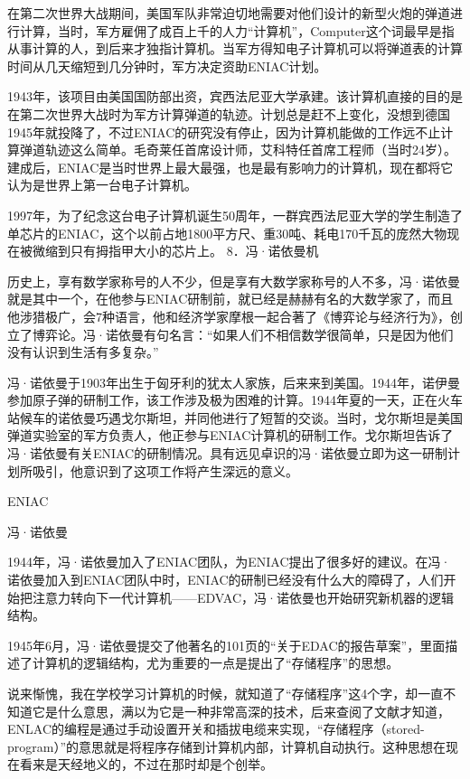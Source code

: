 \documentclass[12pt,UTF8]{ctexbook}
\begin{document}
在第二次世界大战期间，美国军队非常迫切地需要对他们设计的新型火炮的弹道进行计算，当时，军方雇佣了成百上千的人力“计算机”，Computer这个词最早是指从事计算的人，到后来才独指计算机。当军方得知电子计算机可以将弹道表的计算时间从几天缩短到几分钟时，军方决定资助ENIAC计划。

1943年，该项目由美国国防部出资，宾西法尼亚大学承建。该计算机直接的目的是在第二次世界大战时为军方计算弹道的轨迹。计划总是赶不上变化，没想到德国1945年就投降了，不过ENIAC的研究没有停止，因为计算机能做的工作远不止计算弹道轨迹这么简单。毛奇莱任首席设计师，艾科特任首席工程师（当时24岁）。建成后，ENIAC是当时世界上最大最强，也是最有影响力的计算机，现在都将它认为是世界上第一台电子计算机。

1997年，为了纪念这台电子计算机诞生50周年，一群宾西法尼亚大学的学生制造了单芯片的ENIAC，这个以前占地1800平方尺、重30吨、耗电170千瓦的庞然大物现在被微缩到只有拇指甲大小的芯片上。
8．冯·诺依曼机

历史上，享有数学家称号的人不少，但是享有大数学家称号的人不多，冯·诺依曼就是其中一个，在他参与ENIAC研制前，就已经是赫赫有名的大数学家了，而且他涉猎极广，会7种语言，他和经济学家摩根一起合著了《博弈论与经济行为》，创立了博弈论。冯·诺依曼有句名言：“如果人们不相信数学很简单，只是因为他们没有认识到生活有多复杂。”

冯·诺依曼于1903年出生于匈牙利的犹太人家族，后来来到美国。1944年，诺伊曼参加原子弹的研制工作，该工作涉及极为困难的计算。1944年夏的一天，正在火车站候车的诺依曼巧遇戈尔斯坦，并同他进行了短暂的交谈。当时，戈尔斯坦是美国弹道实验室的军方负责人，他正参与ENIAC计算机的研制工作。戈尔斯坦告诉了冯·诺依曼有关ENIAC的研制情况。具有远见卓识的冯·诺依曼立即为这一研制计划所吸引，他意识到了这项工作将产生深远的意义。

ENIAC

冯·诺依曼

1944年，冯·诺依曼加入了ENIAC团队，为ENIAC提出了很多好的建议。在冯·诺依曼加入到ENIAC团队中时，ENIAC的研制已经没有什么大的障碍了，人们开始把注意力转向下一代计算机——EDVAC，冯·诺依曼也开始研究新机器的逻辑结构。

1945年6月，冯·诺依曼提交了他著名的101页的“关于EDAC的报告草案”，里面描述了计算机的逻辑结构，尤为重要的一点是提出了“存储程序”的思想。

说来惭愧，我在学校学习计算机的时候，就知道了“存储程序”这4个字，却一直不知道它是什么意思，满以为它是一种非常高深的技术，后来查阅了文献才知道，ENLAC的编程是通过手动设置开关和插拔电缆来实现，“存储程序（stored-program）”的意思就是将程序存储到计算机内部，计算机自动执行。这种思想在现在看来是天经地义的，不过在那时却是个创举。
\end{document}
